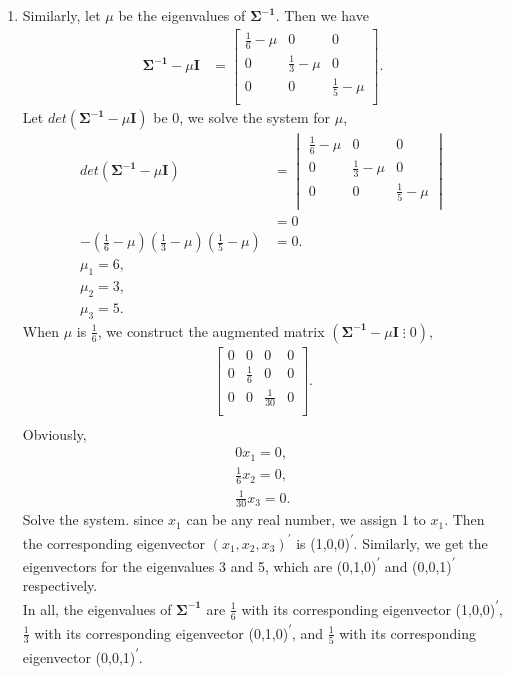\documentclass[10pt]{article}
\begin{document}
\begin{enumerate}[1)]
\item
Similarly, let $\mu$ be the eigenvalues of $\pmb{\Sigma^{-1}}$. Then we have
\begin{align*}
\pmb{\Sigma^{-1}}-\mu\textbf{I}&=
  \begin{bmatrix}
    \frac{1}{6}-\mu & 0 & 0\\
    0 & \frac{1}{3}-\mu & 0\\
    0 & 0 & \frac{1}{5}-\mu\\
  \end{bmatrix}
.
\end{align*}
Let $det(\pmb{\Sigma^{-1}}-\mu\textbf{I})$ be 0, we solve the system for $\mu$,
\begin{align*}
det(\pmb{\Sigma^{-1}}-\mu\textbf{I})&=
  \begin{vmatrix}
    \frac{1}{6}-\mu & 0 & 0\\
    0 & \frac{1}{3}-\mu & 0\\
    0 & 0 & \frac{1}{5}-\mu\\
  \end{vmatrix}
\\
&=0\\
-(\frac{1}{6}-\mu)(\frac{1}{3}-\mu)(\frac{1}{5}-\mu)&=0.\\
\mu_1=6,\\
\mu_2=3,\\
\mu_3=5.
\end{align*}
When $\mu$ is $\frac{1}{6}$, we construct the augmented matrix $(\pmb{\Sigma^{-1}}-\mu\textbf{I}\;\vdots\;0)$,
\begin{align*}
  \begin{bmatrix}
    0 & 0 & 0 & 0\\
    0 & \frac{1}{6} & 0 & 0\\
    0 & 0 & \frac{1}{30} & 0\\
  \end{bmatrix}
.\\
\end{align*}
Obviously,
\begin{align*}
0x_1=0,\\
\frac{1}{6}x_2=0,\\
\frac{1}{30}x_3=0.
\end{align*}
Solve the system. since $x_1$ can be any real number, we assign 1 to $x_1$. Then the corresponding eigenvector $(x_1,x_2,x_3)^{\prime}$ is (1,0,0)\textsuperscript{$\prime$}. Similarly, we get the eigenvectors for the eigenvalues 3 and 5, which are (0,1,0)\textsuperscript{$\prime$} and (0,0,1)\textsuperscript{$\prime$} respectively.\\
In all, the eigenvalues of $\pmb{\Sigma^{-1}}$ are $\frac{1}{6}$ with its corresponding eigenvector (1,0,0)\textsuperscript{$\prime$}, $\frac{1}{3}$ with its corresponding eigenvector (0,1,0)\textsuperscript{$\prime$}, and $\frac{1}{5}$ with its corresponding eigenvector (0,0,1)\textsuperscript{$\prime$}.\\

\end{enumerate}
\end{document}
